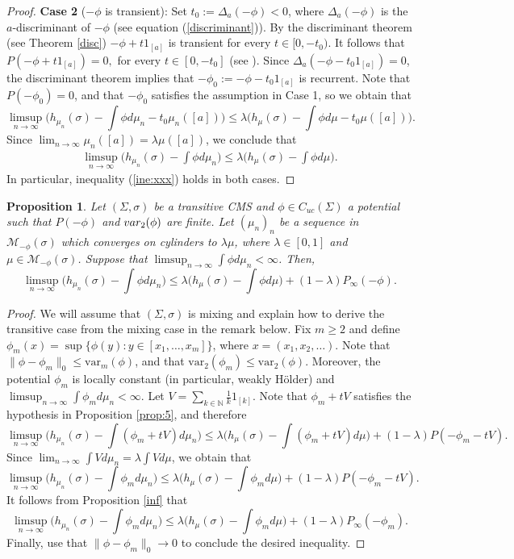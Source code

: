 \documentclass[letterpaper,11pt]{amsart}
\theoremstyle{plain}
\theoremstyle{plain}
\newtheorem{proposition}{Proposition}[subsection]
\theoremstyle{definition}
\theoremstyle{remark}
\def\N{{\mathbb N}}
\def\M{{\mathcal M}}
\begin{document}
\begin{proof}
{\bf Case 2} ($-\phi$ is transient): Set $t_0 := \Delta_a(-\phi) < 0$, where $\Delta_a(-\phi)$ is the $a$-discriminant of $-\phi$ (see equation (\ref{discriminant})). By the discriminant theorem (see Theorem \ref{disc}) $-\phi + t1_{[a]}$ is transient for every $t \in [0, -t_0)$. It follows that $P(-\phi + t1_{[a]}) = 0,$ for every $t \in [0, -t_0]$ (see \cite[Lemma 4.1]{cs}). Since $\Delta_a(-\phi - t_0 1_{[a]}) = 0$, the discriminant theorem implies that $-\phi_0 := -\phi - t_0 1_{[a]}$ is recurrent. Note that $P(-\phi_0)=0$, and that  $-\phi_0$ satisfies the assumption in Case 1, so we obtain that 
$$\limsup_{n\to\infty}\big(h_{\mu_n}(\sigma)-\int \phi d\mu_n-t_0\mu_n([a]) \big)\le \lambda\big(h_\mu(\sigma)-\int \phi d\mu-t_0\mu([a])\big).$$
Since $\lim_{n\to\infty}\mu_n([a])=\lambda\mu([a])$, we conclude that 
\begin{align}\label{ine:xxx}\limsup_{n\to\infty}\big(h_{\mu_n}(\sigma)-\int \phi d\mu_n \big)\le \lambda\big(h_\mu(\sigma)-\int \phi d\mu\big).\end{align}
In particular, inequality (\ref{ine:xxx}) holds in both cases.
\end{proof}


\begin{proposition}\label{theo:valecul}  Let $(\Sigma,\sigma)$ be a transitive CMS and $\phi\in C_{uc}(\Sigma)$ a potential such that $P(-\phi)$ and $\emph{var}_2(\phi)$ are finite.  Let $(\mu_n)_n$ be a sequence  in $\M_{-\phi}(\sigma)$ which converges on cylinders to $\lambda\mu$, where $\lambda\in [0,1]$ and $\mu\in\M_{-\phi}(\sigma)$. Suppose that $\limsup_{n\to\infty}\int \phi  d\mu_n<\infty$. Then,
$$\limsup_{n\to\infty}\big(h_{\mu_n}(\sigma)-\int \phi d\mu_n\big)\le \lambda\big(h_\mu(\sigma)-\int \phi d\mu\big)+(1-\lambda)P_\infty(-\phi).$$
\end{proposition}
\begin{proof} We will assume that $(\Sigma,\sigma)$ is mixing and explain how to derive the transitive case from the mixing case in the remark below. Fix $m\ge 2$ and define $\phi_m(x)=\sup\{\phi(y):y\in[x_1,\ldots, x_{m}]\}$, where $x=(x_1,x_2,\ldots)$. Note that $\|\phi-\phi_m\|_0\le \text{var}_m(\phi)$, and that $\text{var}_2(\phi_m)\le \text{var}_2(\phi)$. Moreover, the potential $\phi_m$ is locally constant (in particular, weakly H\"older) and $\limsup_{n\to\infty}\int \phi_m d\mu_n<\infty$.  Let $V=\sum_{k\in\N}\frac{1}{k}1_{[k]}$. Note that $\phi_m+tV$ satisfies the hypothesis in Proposition \ref{prop:5}, and therefore 
$$\limsup_{n\to\infty}\big(h_{\mu_n}(\sigma)-\int (\phi_m+tV) d\mu_n\big)\le \lambda\big(h_\mu(\sigma)-\int (\phi_m+tV) d\mu\big)+(1-\lambda)P(-\phi_m-tV).$$
Since $\lim_{n\to\infty}\int Vd\mu_n=\lambda \int Vd\mu$, we obtain that
$$\limsup_{n\to\infty}\big(h_{\mu_n}(\sigma)-\int \phi_m d\mu_n\big)\le \lambda\big(h_\mu(\sigma)-\int \phi_m d\mu\big)+(1-\lambda)P(-\phi_m-tV).$$
It follows from Proposition \ref{inf} that 
$$\limsup_{n\to\infty}\big(h_{\mu_n}(\sigma)-\int \phi_m d\mu_n\big)\le \lambda\big(h_\mu(\sigma)-\int \phi_m d\mu\big)+(1-\lambda)P_\infty(-\phi_m).$$
Finally, use that $\|\phi-\phi_m\|_0\to0$ to conclude the desired inequality.
\end{proof}
\end{document}
